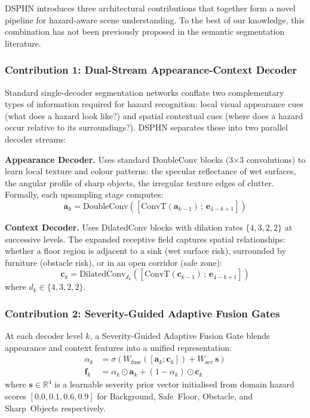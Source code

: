 DSPHN introduces three architectural contributions that together
form a novel pipeline for hazard-aware scene understanding.
To the best of our knowledge, this combination has not been
previously proposed in the semantic segmentation literature.

\subsubsection{Contribution 1: Dual-Stream Appearance-Context Decoder}

Standard single-decoder segmentation networks conflate two
complementary types of information required for hazard recognition:
local visual appearance cues (what does a hazard look like?) and
spatial contextual cues (where does a hazard occur relative to
its surroundings?). DSPHN separates these into two parallel
decoder streams:

\noindent\textbf{Appearance Decoder.}
Uses standard DoubleConv blocks (3$\times$3 convolutions) to learn
local texture and colour patterns: the specular reflectance of wet
surfaces, the angular profile of sharp objects, the irregular
texture edges of clutter. Formally, each upsampling stage computes:
\begin{equation}
\mathbf{a}_k = \text{DoubleConv}\!\left(
    [\text{ConvT}(\mathbf{a}_{k-1})\,;\,\mathbf{e}_{4-k+1}]\right)
\end{equation}

\noindent\textbf{Context Decoder.}
Uses DilatedConv blocks with dilation rates $\{4,3,2,2\}$ at
successive levels. The expanded receptive field captures spatial
relationships: whether a floor region is adjacent to a sink (wet
surface risk), surrounded by furniture (obstacle risk), or in an
open corridor (safe zone):
\begin{equation}
\mathbf{c}_k = \text{DilatedConv}_{d_k}\!\left(
    [\text{ConvT}(\mathbf{c}_{k-1})\,;\,\mathbf{e}_{4-k+1}]\right)
\end{equation}
where $d_k \in \{4,3,2,2\}$.

\subsubsection{Contribution 2: Severity-Guided Adaptive Fusion Gates}

At each decoder level $k$, a Severity-Guided Adaptive Fusion Gate
blends appearance and context features into a unified representation:
\begin{align}
\alpha_k &= \sigma\!\left(
    W_\text{fuse}([\mathbf{a}_k;\mathbf{c}_k])
    + W_\text{sev}\,\mathbf{s}
\right) \label{eq:gate}\\
\mathbf{f}_k &= \alpha_k \odot \mathbf{a}_k
    + (1-\alpha_k) \odot \mathbf{c}_k \label{eq:fused}
\end{align}
where $\mathbf{s} \in \mathbb{R}^4$ is a learnable severity prior
vector initialised from domain hazard scores $[0.0, 0.1, 0.6, 0.9]$
for Background, Safe~Floor, Obstacle, and Sharp~Objects respectively.

